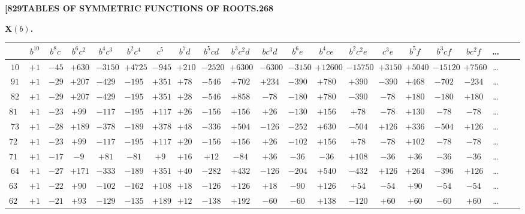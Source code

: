 \documentclass[12pt,a4paper]{article}
\theoremstyle{definition}
\begin{document}
\newpage
\setcounter{page}{268}

\noindent\textbf{[829}\hfill\textbf{TABLES OF SYMMETRIC FUNCTIONS OF ROOTS.}\hfill\textbf{268}

\bigskip

\noindent\textbf{X$(b)$.}
\begin{center}
\tiny
\begin{tabular}{c|c|c|c|c|c|c|c|c|c|c|c|c|c|c|c|c|c|c|c|c}
& $b^{10}$ & $b^8c$ & $b^6c^2$ & $b^4c^3$ & $b^2c^4$ & $c^5$ & $b^7d$ & $b^5cd$ & $b^3c^2d$ & $bc^3d$ & $b^6e$ & $b^4ce$ & $b^2c^2e$ & $c^3e$ & $b^5f$ & $b^3cf$ & $bc^2f$ & \dots \\
\hline
$10$ & $+1$ & $-45$ & $+630$ & $-3150$ & $+4725$ & $-945$ & $+210$ & $-2520$ & $+6300$ & $-6300$ & $-3150$ & $+12600$ & $-15750$ & $+3150$ & $+5040$ & $-15120$ & $+7560$ & \dots \\
$91$ & $+1$ & $-29$ & $+207$ & $-429$ & $-195$ & $+351$ & $+78$ & $-546$ & $+702$ & $+234$ & $-390$ & $+780$ & $+390$ & $-390$ & $+468$ & $-702$ & $-234$ & \dots \\
$82$ & $+1$ & $-29$ & $+207$ & $-429$ & $-195$ & $+351$ & $+28$ & $-546$ & $+858$ & $-78$ & $-180$ & $+780$ & $-390$ & $-78$ & $+180$ & $-180$ & $+180$ & \dots \\
$811$ & $+1$ & $-23$ & $+99$ & $-117$ & $-195$ & $+117$ & $+26$ & $-156$ & $+156$ & $+26$ & $-130$ & $+156$ & $+78$ & $-78$ & $+130$ & $-78$ & $-78$ & \dots \\
$73$ & $+1$ & $-28$ & $+189$ & $-378$ & $-189$ & $+378$ & $+48$ & $-336$ & $+504$ & $-126$ & $-252$ & $+630$ & $-504$ & $+126$ & $+336$ & $-504$ & $+126$ & \dots \\
$721$ & $+1$ & $-23$ & $+99$ & $-117$ & $-195$ & $+117$ & $+20$ & $-156$ & $+156$ & $+26$ & $-102$ & $+156$ & $+78$ & $-78$ & $+102$ & $-78$ & $-78$ & \dots \\
$7111$ & $+1$ & $-17$ & $-9$ & $+81$ & $-81$ & $+9$ & $+16$ & $+12$ & $-84$ & $+36$ & $-36$ & $-36$ & $+108$ & $-36$ & $+36$ & $-36$ & $-36$ & \dots \\
$64$ & $+1$ & $-27$ & $+171$ & $-333$ & $-189$ & $+351$ & $+40$ & $-282$ & $+432$ & $-126$ & $-204$ & $+540$ & $-432$ & $+126$ & $+264$ & $-396$ & $+126$ & \dots \\
$631$ & $+1$ & $-22$ & $+90$ & $-102$ & $-162$ & $+108$ & $+18$ & $-126$ & $+126$ & $+18$ & $-90$ & $+126$ & $+54$ & $-54$ & $+90$ & $-54$ & $-54$ & \dots \\
$622$ & $+1$ & $-21$ & $+93$ & $-129$ & $-135$ & $+189$ & $+12$ & $-138$ & $+192$ & $-60$ & $-60$ & $+138$ & $-120$ & $+60$ & $+60$ & $-60$ & $+60$ & \dots \\

\end{tabular}
\end{center}
\end{document}
